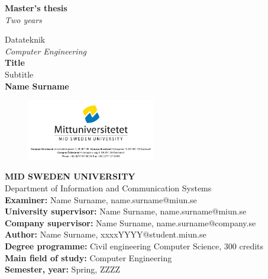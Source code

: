 \documentclass[12pt]{report}
\begin{document}
{\sffamily
{}
\begin{titlepage}
\begin{tcolorbox}

\vspace{38ex}
\hspace*{6.8ex} \Huge{\textbf{Master's thesis}}\\
\hspace*{2.8ex} \textit{\LARGE{Two years}}\\
\vspace{2ex}

\hspace*{3.2ex} \large{Datateknik}\\
\hspace*{6ex} \textit{Computer Engineering}\\


\hspace*{6ex} \textbf{Title}\\
\hspace*{6.2ex} Subtitle\\


\hspace*{6.2ex} \textbf{Name Surname}\\
\vspace{2ex}
\end{tcolorbox}
\begin{figure}[h]
    \centering
    \includegraphics[width=0.5\textwidth,trim=4 4 4 4,clip]{Illustrations/miunlogo.png}
    \label{fig:my_label}
\end{figure}
\end{titlepage}
\restoregeometry
\vspace*{\fill}
\noindent\textbf{MID SWEDEN UNIVERSITY}\\
Department of Information and Communication Systems\\
\textbf{Examiner:} Name Surname, name.surname@miun.se\\
\textbf{University supervisor:} Name Surname, name.surname@miun.se\\
\textbf{Company supervisor:} Name Surname, name.surname@company.se\\
\textbf{Author:} Name Surname, xxxxYYYY@student.miun.se\\
\textbf{Degree programme:} Civil engineering Computer Science, 300 credits\\
\textbf{Main field of study:} Computer Engineering\\
\textbf{Semester, year:} Spring, ZZZZ  \\
\newpage
{}
}
\end{document}

